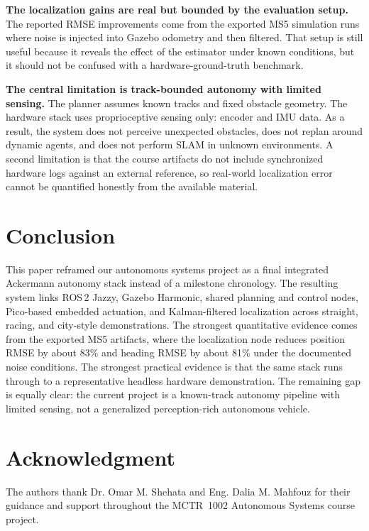 \documentclass[conference]{IEEEtran}
\begin{document}
\textbf{The localization gains are real but bounded by the evaluation setup.}
The reported RMSE improvements come from the exported MS5 simulation runs where
noise is injected into Gazebo odometry and then filtered. That setup is still
useful because it reveals the effect of the estimator under known conditions, but
it should not be confused with a hardware-ground-truth benchmark.

\textbf{The central limitation is track-bounded autonomy with limited sensing.}
The planner assumes known tracks and fixed obstacle geometry. The hardware stack
uses proprioceptive sensing only: encoder and IMU data. As a result, the system
does not perceive unexpected obstacles, does not replan around dynamic agents,
and does not perform SLAM in unknown environments. A second limitation is that
the course artifacts do not include synchronized hardware logs against an
external reference, so real-world localization error cannot be quantified
honestly from the available material.

\section{Conclusion}
\label{sec:conclusion}

This paper reframed our autonomous systems project as a final integrated
Ackermann autonomy stack instead of a milestone chronology. The resulting system
links ROS\,2 Jazzy, Gazebo Harmonic, shared planning and control nodes,
Pico-based embedded actuation, and Kalman-filtered localization across straight,
racing, and city-style demonstrations. The strongest quantitative evidence comes
from the exported MS5 artifacts, where the localization node reduces position
RMSE by about 83\% and heading RMSE by about 81\% under the documented noise
conditions. The strongest practical evidence is that the same stack runs through
to a representative headless hardware demonstration. The remaining gap is equally clear: the
current project is a known-track autonomy pipeline with limited sensing, not a
generalized perception-rich autonomous vehicle.

\section*{Acknowledgment}

The authors thank Dr. Omar M. Shehata and Eng. Dalia M. Mahfouz for their
guidance and support throughout the MCTR~1002 Autonomous Systems course project.



\end{document}

